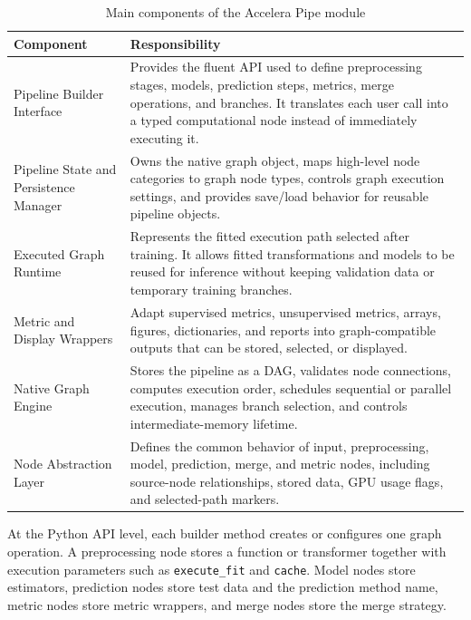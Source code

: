 \documentclass[12pt,a4paper,oneside]{report}
\begin{document}
\begin{table}[!htbp]
\centering
\small
\renewcommand{\arraystretch}{1.15}
\setlength{\tabcolsep}{4pt}
\caption{Main components of the Accelera Pipe module}
\label{tab:accelera-pipe-components}
\begin{tabular}{p{}p{}}
\toprule
\textbf{Component} & \textbf{Responsibility} \\
\midrule
Pipeline Builder Interface &
Provides the fluent API used to define preprocessing stages, models, prediction
steps, metrics, merge operations, and branches. It translates each user call into
a typed computational node instead of immediately executing it. \\
\midrule
Pipeline State and Persistence Manager &
Owns the native graph object, maps high-level node categories to graph node
types, controls graph execution settings, and provides save/load behavior for
reusable pipeline objects. \\
\midrule
Executed Graph Runtime &
Represents the fitted execution path selected after training. It allows fitted
transformations and models to be reused for inference without keeping validation
data or temporary training branches. \\
\midrule
Metric and Display Wrappers &
Adapt supervised metrics, unsupervised metrics, arrays, figures, dictionaries,
and reports into graph-compatible outputs that can be stored, selected, or
displayed. \\
\midrule
Native Graph Engine &
Stores the pipeline as a DAG, validates node connections, computes execution
order, schedules sequential or parallel execution, manages branch selection, and
controls intermediate-memory lifetime. \\
\midrule
Node Abstraction Layer &
Defines the common behavior of input, preprocessing, model, prediction, merge,
and metric nodes, including source-node relationships, stored data, GPU usage
flags, and selected-path markers. \\
\bottomrule
\end{tabular}
\end{table}

At the Python API level, each builder method creates or configures one graph
operation. A preprocessing node stores a function or transformer together with
execution parameters such as \texttt{execute\_fit} and \texttt{cache}. Model
nodes store estimators, prediction nodes store test data and the prediction
method name, metric nodes store metric wrappers, and merge nodes store the merge
strategy.
\end{document}
